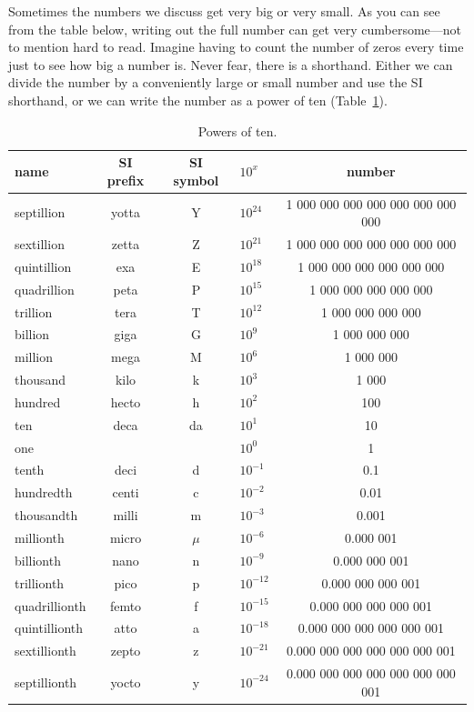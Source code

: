 Sometimes the numbers we discuss get very big or very small.  As you can see
from the table below, writing out the full number can get very cumbersome---not
to mention hard to read.  Imagine having to count the number of zeros every
time just to see how big a number is.  Never fear, there is a shorthand.  Either
we can divide the number by a conveniently large or small number and use the SI
shorthand, or we can write the number as a power of ten (Table~\ref{tab:pot}).
\begin{table}[hbt]
    \centering
    \caption{Powers of ten.}
    \label{tab:pot}
    \begin{tabular}{@{}lcclc@{}}
        \toprule
        \textbf{name} & \textbf{SI prefix} & \textbf{SI symbol} & $10^x$ & \textbf{number} \\
        \midrule
        septillion & yotta & Y & $10^{24}$ & 1 000 000 000 000 000 000 000 000 \\
        sextillion & zetta & Z & $10^{21}$ & 1 000 000 000 000 000 000 000 \\
        quintillion & exa & E & $10^{18}$ & 1 000 000 000 000 000 000 \\
        quadrillion & peta & P & $10^{15}$ & 1 000 000 000 000 000 \\
        trillion & tera & T & $10^{12}$ & 1 000 000 000 000 \\
        billion & giga & G & $10^9$ & 1 000 000 000 \\
        million & mega & M & $10^6$ & 1 000 000 \\
        thousand & kilo & k & $10^3$ & 1 000 \\
        hundred & hecto & h & $10^2$ & 100 \\
        ten & deca & da & $10^1$ & 10 \\
        one & {} & {} & $10^0$ & 1 \\
        tenth & deci & d & $10^{-1}$ & 0.1 \\
        hundredth & centi & c & $10^{-2}$ & 0.01 \\
        thousandth & milli & m & $10^{-3}$ & 0.001 \\
        millionth & micro & $\mu$ & $10^{-6}$ & 0.000 001 \\
        billionth & nano & n & $10^{-9}$ & 0.000 000 001 \\
        trillionth & pico & p & $10^{-12}$ & 0.000 000 000 001 \\
        quadrillionth & femto & f & $10^{-15}$ & 0.000 000 000 000 001 \\
        quintillionth & atto & a & $10^{-18}$ & 0.000 000 000 000 000 001 \\
        sextillionth & zepto & z & $10^{-21}$ & 0.000 000 000 000 000 000 001 \\
        septillionth & yocto & y & $10^{-24}$ & 0.000 000 000 000 000 000 000 001 \\
        \bottomrule
    \end{tabular}
\end{table}

